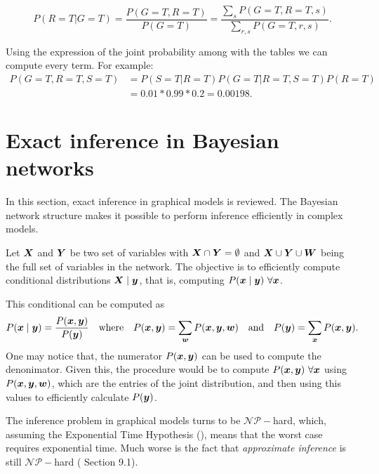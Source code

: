 \begin{exampleth}
\[
P(R = T | G = T) = \frac{P(G = T, R = T)}{P(G=T)} = \frac{\sum_{s}P(G=T, R=T,
s)}{\sum_{r,s} P(G=T, r, s)}.
\]

Using the expression of the joint probability among with the tables we can
compute every term. For example:
\[
\begin{aligned}
  P(G=T, R=T, S=T) &= P(S=T|R=T)P(G=T|R=T,S=T)P(R=T) \\
  &= 0.01 * 0.99 * 0.2 = 0.00198.
\end{aligned}
\]
\end{exampleth}

\section{Exact inference in Bayesian networks}

In this section, exact inference in graphical models is reviewed. The Bayesian network structure makes it possible to perform inference efficiently in complex models.

Let \(\bm{X}\) and \(\bm{Y}\) be two set of variables with \(\bm{X} \cap \bm{Y} = \emptyset\) and \(\bm{X} \cup \bm{Y} \cup \bm{W}\) being the full set of variables in the network. The objective is to efficiently compute conditional distributions \(\bm{X} \mid \bm{y}\), that is, computing \(P(\bm{x} \mid \bm{y})\ \forall \bm{x}\).

This conditional can be computed as
\[
  P(\bm{x} \mid \bm{y}) = \frac{P(\bm{x}, \bm{y})}{P(\bm{y})}\quad \text{where}\quad P(\bm{x}, \bm{y}) = \sum_{\bm{w}} P(\bm{x}, \bm{y}, \bm{w}) \quad \text{and} \quad P(\bm{y}) = \sum_{\bm{x}}P(\bm{x}, \bm{y}).
\]
One may notice that, the numerator \(P(\bm{x}, \bm{y})\) can be used to compute the denonimator. Given this, the procedure would be to compute \(P(\bm{x} , \bm{y}) \ \forall \bm{x}\) using \(P(\bm{x}, \bm{y}, \bm{w})\), which are the entries of the joint distribution, and then using this values to efficiently calculate \(P(\bm{y})\).

The inference problem in graphical models turns to be \(\mathcal{NP}-\)hard, which, assuming the Exponential Time Hypothesis (\cite{impagliazzo1999complexity}), means that the worst case requires exponential time. Much worse is the fact that \emph{approximate inference} is still \(\mathcal{NP}-\)hard (\cite{koller_friedman} Section 9.1).

